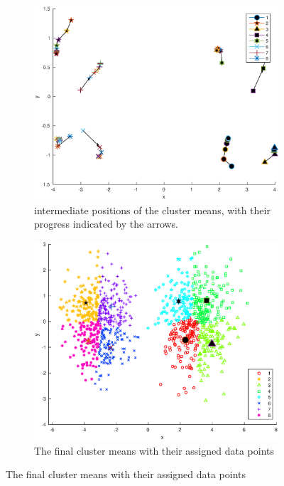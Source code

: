 \documentclass[10pt]{article}
\begin{document}
\begin{figure}[H]
  \centering
  \caption{Results for k=8}
  \begin{subfigure}[b]{.45\textwidth}
    \includegraphics[width=\columnwidth]{Fig1_k8.eps}
    \caption{intermediate positions of the cluster means, 
    with their progress indicated by the arrows.}
  \end{subfigure}
  \quad
  \begin{subfigure}[b]{.45\textwidth}
    \includegraphics[width=\columnwidth]{Fig2_k8.eps}
    \caption{The final cluster means with their assigned data points}
  \end{subfigure}
  \label{fig1.3}
\end{figure}
\end{document}
